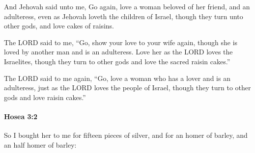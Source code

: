 			\begin{versebox}
					\item[BHS] 
					\item[LXX] 
					\item[ASV] And Jehovah said unto me, Go again, love a woman beloved of her friend, and an adulteress, even as Jehovah loveth the children of Israel, though they turn unto other gods, and love cakes of raisins.
					\item[NIV] The LORD said to me, “Go, show your love to your wife again, though she is loved by another man and is an adulteress. Love her as the LORD loves the Israelites, though they turn to other gods and love the sacred raisin cakes.”
					\item[NRSV] The LORD said to me again, “Go, love a woman who has a lover and is an adulteress, just as the LORD loves the people of Israel, though they turn to other gods and love raisin cakes.”
			\end{versebox}

		\paragraph{Hosea 3:2} %
			\label{HOSEA-3-2}

			So I bought her to me for fifteen pieces of silver, and for an homer of barley, and an half homer of barley:

